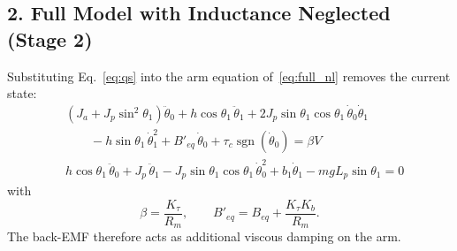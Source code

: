 \documentclass[a4paper,11pt]{article}
\newcommand{\sgn}{\operatorname{sgn}}
\begin{document}
\subsection{2. Full Model with Inductance Neglected (Stage 2)}
\label{sec:stage2model}
Substituting Eq.~\eqref{eq:qs} into the arm equation of~\eqref{eq:full_nl} removes the current state:
\begin{equation}
\boxed{
\begin{aligned}
  & \left(J_a + J_p \sin^2\theta_1\right)\ddot\theta_0 + h \cos\theta_1\, \ddot\theta_1 + 2 J_p \sin\theta_1 \cos\theta_1\, \dot\theta_0 \dot\theta_1\\
  & \qquad - h \sin\theta_1\, \dot\theta_1^2 + B'_{eq}\, \dot\theta_0 + \tau_c \sgn(\dot\theta_0) = \beta V\\[4pt]
  & h \cos\theta_1\, \ddot\theta_0 + J_p\, \ddot\theta_1 - J_p \sin\theta_1 \cos\theta_1\, \dot\theta_0^2 + b_1 \dot\theta_1 - m g L_p \sin\theta_1 = 0
\end{aligned}
}
\label{eq:full_est}
\end{equation}
with
\begin{equation}
  \beta = \frac{K_\tau}{R_m}, \qquad B'_{eq} = B_{eq} + \frac{K_\tau K_b}{R_m} .
  \label{eq:beta}
\end{equation}
The back-EMF therefore acts as additional viscous damping on the arm.
\end{document}
